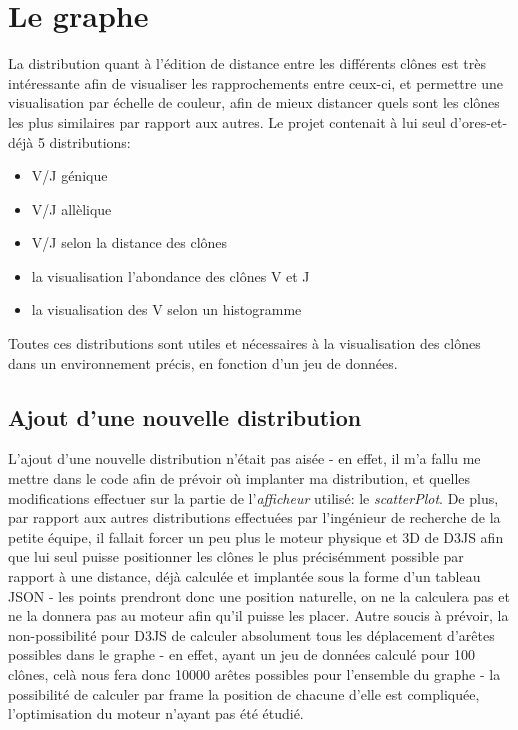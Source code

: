 \documentclass{report}
\begin{document}
\section{Le graphe}
La distribution quant à l'édition de distance entre les différents clônes est très intéressante afin de visualiser les rapprochements entre ceux-ci, et permettre une visualisation par échelle de couleur, afin de mieux distancer quels sont les clônes les plus similaires par rapport aux autres.
\newline
Le projet contenait à lui seul d'ores-et-déjà 5 distributions:
\begin{itemize}
\item V/J génique
\item V/J allèlique
\item V/J selon la distance des clônes
\item la visualisation l'abondance des clônes V et J
\item la visualisation des V selon un histogramme
\end{itemize}
Toutes ces distributions sont utiles et nécessaires à la visualisation des clônes dans un environnement précis, en fonction d'un jeu de données.

\subsection{Ajout d'une nouvelle distribution}
L'ajout d'une nouvelle distribution n'était pas aisée - en effet, il m'a fallu me mettre dans le code afin de prévoir où implanter ma distribution, et quelles modifications effectuer sur la partie de l'\textit{afficheur} utilisé: le \textit{scatterPlot}.
\newline
De plus, par rapport aux autres distributions effectuées par l'ingénieur de recherche de la petite équipe, il fallait forcer un peu plus le moteur physique et 3D de D3JS afin que lui seul puisse positionner les clônes le plus précisémment possible par rapport à une distance, déjà calculée et implantée sous la forme d'un tableau JSON - les points prendront donc une position naturelle, on ne la calculera pas et ne la donnera pas au moteur afin qu'il puisse les placer.
\newline
Autre soucis à prévoir, la non-possibilité pour D3JS de calculer absolument tous les déplacement d'arêtes possibles dans le graphe - en effet, ayant un jeu de données calculé pour 100 clônes, celà nous fera donc 10000 arêtes possibles pour l'ensemble du graphe - la possibilité de calculer par frame la position de chacune d'elle est compliquée, l'optimisation du moteur n'ayant pas été étudié.
\end{document}
